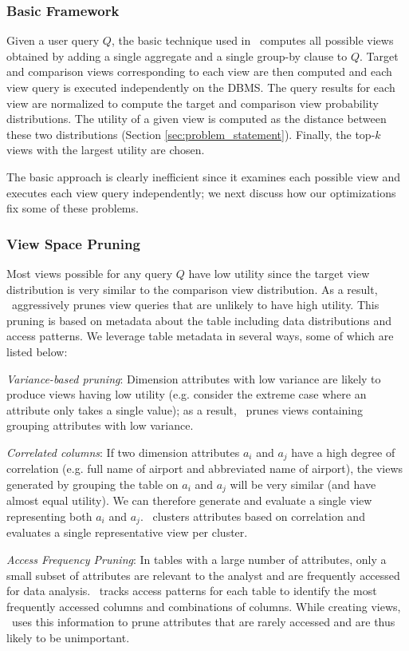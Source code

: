 \subsubsection{Basic Framework}
\label{subsubsec:basic_framework}

Given a user query $Q$, the basic technique used in \SeeDB\ computes all
possible views obtained by adding a single aggregate and a single group-by
clause to $Q$. Target and comparison views corresponding to each view are then
computed and each view query is executed independently on the DBMS. The query
results for each view are normalized to compute the target and comparison view
probability distributions. The utility of a given view is computed as the
distance between these two distributions (Section \ref{sec:problem_statement}).
Finally, the top-$k$ views with the largest utility are chosen. 

The basic approach is clearly inefficient
since it examines each possible view and executes each view query independently;
we next discuss how our optimizations fix some of these problems.

\subsubsection{View Space Pruning}
\label{subsubsec:view_space_pruning}

Most views possible for any query $Q$ have low utility since the target view
distribution is very similar to the comparison view distribution. 
As a result,
\SeeDB\ aggressively prunes view queries that are unlikely to have high
utility. 
This pruning is based on metadata about the table including data
distributions and access patterns.
We leverage table metadata in several ways, some of which are listed below:
\begin{denselist}
\item {\it Variance-based pruning}: Dimension attributes with low variance are
likely to produce views having low utility (e.g. consider the extreme case where
an attribute only takes a single value); as a result, \SeeDB\ prunes views
containing grouping attributes with low variance.
\item {\it Correlated columns}: If two dimension attributes $a_i$ and $a_j$ have
a high degree of correlation (e.g. full name of airport and abbreviated name of
airport), the views generated by grouping the table on $a_i$ and $a_j$ will be
very similar (and have almost equal utility). We can therefore generate and
evaluate a single view representing both $a_i$ and $a_j$. \SeeDB\ clusters
attributes based on correlation and evaluates a single representative view per
cluster.
\item {\it Access Frequency Pruning}: In tables with a large number of
attributes, only a small subset of attributes are relevant to the analyst and
are frequently accessed for data analysis. \SeeDB\ tracks access patterns
for each table to identify the most frequently accessed columns and combinations of
columns. While creating views, \SeeDB\ uses this information to prune attributes
that are rarely accessed and are thus likely to be unimportant.
\end{denselist}

